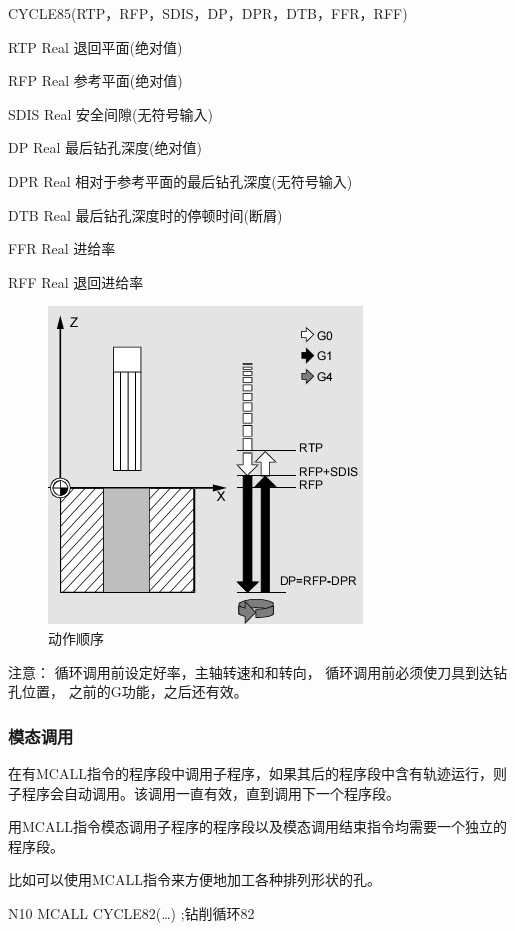 CYCLE85(RTP，RFP，SDIS，DP，DPR，DTB，FFR，RFF)

RTP Real 退回平面(绝对值) 

RFP Real 参考平面(绝对值) 

SDIS Real 安全间隙(无符号输入) 

DP Real 最后钻孔深度(绝对值) 

DPR Real 相对于参考平面的最后钻孔深度(无符号输入) 

DTB Real 最后钻孔深度时的停顿时间(断屑) 

FFR Real 进给率 

RFF Real 退回进给率

\begin{figure}[h]
	\centering
	\includegraphics[width=0.7\linewidth]{data/image/23-3}
	\caption{动作顺序}
	\label{fig:23-3}
\end{figure}

注意： 循环调用前设定好率，主轴转速和和转向，
循环调用前必须使刀具到达钻孔位置，
之前的G功能，之后还有效。

\subsubsection{模态调用}

在有MCALL指令的程序段中调用子程序，如果其后的程序段中含有轨迹运行，则子程序会自动调用。该调用一直有效，直到调用下一个程序段。 

用MCALL指令模态调用子程序的程序段以及模态调用结束指令均需要一个独立的程序段。

比如可以使用MCALL指令来方便地加工各种排列形状的孔。

N10 MCALL CYCLE82(…)      ;钻削循环82 

